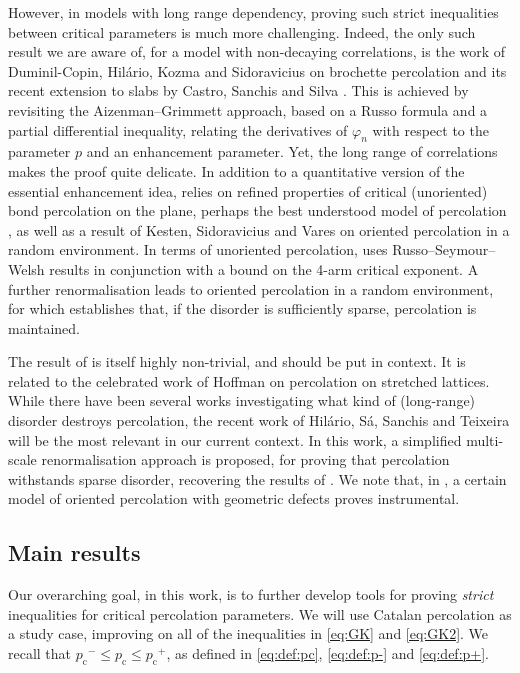 \documentclass[pdflatex,sn-mathphys-num]{sn-jnl}%
\newcommand{\1}{{\ensuremath{\mathbf{1}}} }
\newcommand{\pc}{\ensuremath{p_{\mathrm{c}} }}
\theoremstyle{thmstyleone}%
\theoremstyle{thmstyletwo}%
\theoremstyle{thmstylethree}%
\begin{document}
However, in models with long range dependency, proving such strict inequalities between critical parameters is much more challenging. Indeed, the only such result we are aware of, for a model with non-decaying correlations, is the work
of Duminil-Copin, Hilário, Kozma and Sidoravicius \cite{Duminil-Copin18b} on brochette percolation and its recent extension to slabs by Castro, Sanchis and Silva \cite{Castro24}. This is achieved by revisiting the Aizenman--Grimmett approach, based on a Russo formula and a partial differential inequality, relating the derivatives of $\varphi_n$ with respect to the parameter $p$ and an enhancement parameter. Yet, the long range of correlations makes the proof quite delicate. In addition to a quantitative version of the essential enhancement idea, \cite{Duminil-Copin18b} relies on refined properties of critical (unoriented) bond percolation on the plane, perhaps the best understood model of percolation \cite{Grimmett99}, as well as a result of Kesten, Sidoravicius and Vares \cite{Kesten22} on oriented percolation in a random environment. In terms of unoriented percolation, \cite{Duminil-Copin18b} uses Russo--Seymour--Welsh results in conjunction with a bound on the 4-arm critical exponent. A further renormalisation leads to oriented percolation in a random environment, for which \cite{Kesten22} establishes that, if the disorder is sufficiently sparse, percolation is maintained.

The result of \cite{Kesten22} is itself highly non-trivial, and should be put in context. It is related to the celebrated work of Hoffman \cite{Hoffman05} on percolation on stretched lattices. While there have been several works investigating what kind of (long-range) disorder destroys percolation,
the recent work of Hil\'ario, S\'a, Sanchis and Teixeira \cite{Hilario23} will be the most relevant 
in our current context. 
In this work, a simplified multi-scale renormalisation 
approach is proposed, for proving that percolation withstands sparse disorder, recovering the results of \cite{Hoffman05,Kesten22}. 
We note that, in \cite{Hilario23}, a certain model of oriented percolation with geometric defects proves instrumental.

\subsection{Main results}
Our overarching goal, in this work, 
is to further develop tools for proving {\it strict} inequalities for critical 
percolation parameters. We will use Catalan percolation as a study case, 
improving on all of the inequalities in \eqref{eq:GK} and \eqref{eq:GK2}. 
We recall that $\pc^-\le \pc\le\pc^+$, as defined in \eqref{eq:def:pc}, \eqref{eq:def:p-} and \eqref{eq:def:p+}.
\end{document}
